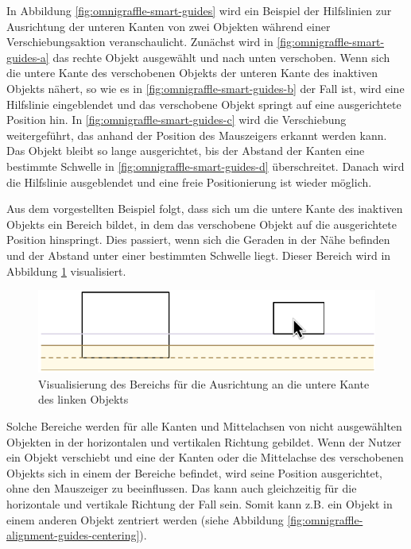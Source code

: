 In Abbildung \ref{fig:omnigraffle-smart-guides} wird ein Beispiel der Hilfslinien zur Ausrichtung der unteren Kanten von zwei Objekten während einer Verschiebungsaktion veranschaulicht. Zunächst wird in \ref{fig:omnigraffle-smart-guides-a} das rechte Objekt ausgewählt und nach unten verschoben. Wenn sich die untere Kante des verschobenen Objekts der unteren Kante des inaktiven Objekts nähert, so wie es in \ref{fig:omnigraffle-smart-guides-b} der Fall ist, wird eine Hilfslinie eingeblendet und das verschobene Objekt springt auf eine ausgerichtete Position hin. In \ref{fig:omnigraffle-smart-guides-c} wird die Verschiebung weitergeführt, das anhand der Position des Mauszeigers erkannt werden kann. Das Objekt bleibt so lange ausgerichtet, bis der Abstand der Kanten eine bestimmte Schwelle in \ref{fig:omnigraffle-smart-guides-d} überschreitet. Danach wird die Hilfslinie ausgeblendet und eine freie Positionierung ist wieder möglich.

Aus dem vorgestellten Beispiel folgt, dass sich um die untere Kante des inaktiven Objekts ein Bereich bildet, in dem das verschobene Objekt auf die ausgerichtete Position hinspringt. Dies passiert, wenn sich die Geraden in der Nähe befinden und der Abstand unter einer bestimmten Schwelle liegt. Dieser Bereich wird in Abbildung \ref{fig:omnigraffle-smart-guides-snap-area} visualisiert.

\begin{figure}[hbt]
    \centering
    \includegraphics{resources/omnigraffle-smart-guides-snap-area}
    \caption{Visualisierung des Bereichs für die Ausrichtung an die untere Kante des linken Objekts}
    \label{fig:omnigraffle-smart-guides-snap-area}
\end{figure}

Solche Bereiche werden für alle Kanten und Mittelachsen von nicht ausgewählten Objekten in der horizontalen und vertikalen Richtung gebildet. Wenn der Nutzer ein Objekt verschiebt und eine der Kanten oder die Mittelachse des verschobenen Objekts sich in einem der Bereiche befindet, wird seine Position ausgerichtet, ohne den Mauszeiger zu beeinflussen. Das kann auch gleichzeitig für die horizontale und vertikale Richtung der Fall sein. Somit kann z.B. ein Objekt in einem anderen Objekt zentriert werden (siehe Abbildung \ref{fig:omnigraffle-alignment-guides-centering}).

